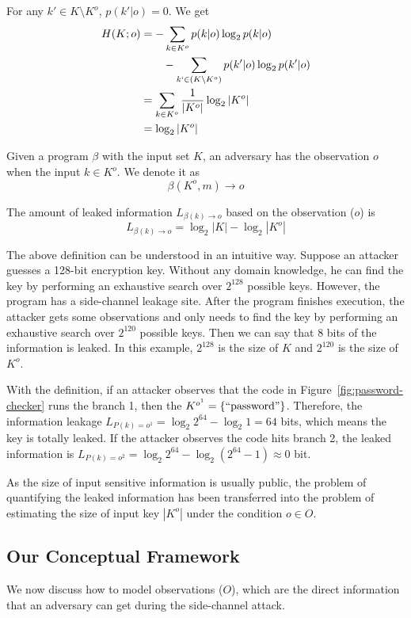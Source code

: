 For any $k' \in K \setminus K^o$, $p(k'|o) = 0$. We get
\begin{align*}
    H(K;o) & = - \sum_{k {\in} K^o}{p(k|o)\log_2p(k|o)}                         \\
           & \qquad   - \sum_{k` {\in} (K \setminus K^o)}{p(k'|o)\log_2p(k'|o)} \\
           & = \sum_{k {\in} K^o}\frac{1}{|K^o|}\log_2{|K^o|}                   \\
           & = \log_2{|K^o|}
\end{align*}

\begin{mydef}
    \label{def}
    Given a program $\beta$ with the input set $K$,
    an adversary has the observation $o$ when the input $k{\in}K^o$.
    We denote it as
    $$\beta(K^o, m) \rightarrow	o$$

    The amount of leaked information $L_{\beta(k)\rightarrow o}$ based on the observation ($o$) is
    $$L_{\beta(k)\rightarrow o} = \log_2{|K|} - \log_2{|K^o|}$$
\end{mydef}
\vspace*{-5pt}

The above definition can be understood in an intuitive way. Suppose an attacker
guesses a 128-bit encryption key. 
Without any domain knowledge, 
he can find the key by performing an exhaustive search over $2^{128}$ possible keys. 
However, the program has a side-channel leakage site. After the program finishes execution, the
attacker gets some observations and only needs to find the key by performing an
exhaustive search over $2^{120}$ possible keys. Then we can say that 8 bits of the information
is leaked. In this example, $2^{128}$ is the size of $K$ and $2^{120}$ is the size of $K^o$.

With the definition, if an attacker observes that the code in
Figure~\ref{fig:password-checker} runs the branch 1, then the $K^{o^{1}} =
\{\mathrm{``password"}\}$. Therefore, the information leakage $L_{P(k)=o^{1}} =
\log_2{2^{64}} - \log_2{1} = 64$ bits, which means the key is totally leaked. If
the attacker observes the code hits branch 2, the leaked information is
$L_{P(k)=o^{2}} = \log_2{2^{64}} - \log_2{(2^{64}-1)} \approx 0$ bit.

As the size of input sensitive information is
usually public, the problem of quantifying the leaked information has been
transferred into the problem of estimating the size of input key $|K^o|$ under
the condition $o \in O$. 

\subsection{Our Conceptual Framework}
\label{side-channel:condition}
We now discuss how to model observations ($O$), which are the direct information
that an adversary can get during the side-channel attack.

